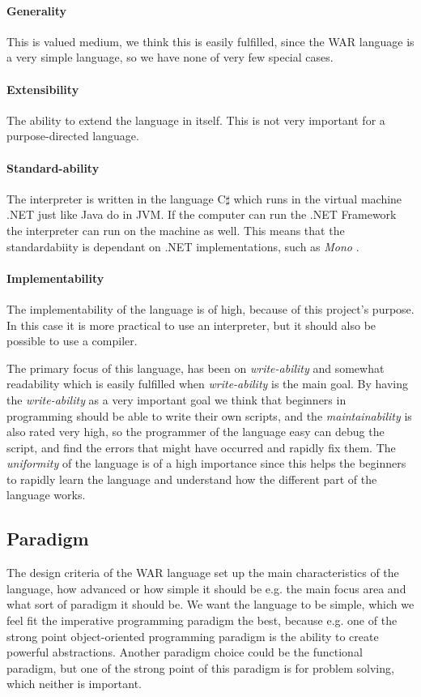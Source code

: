\paragraph{Generality} This is valued medium, we think this is easily fulfilled, since the WAR language is a very simple language, so we have none of very few special cases.

\paragraph{Extensibility} The ability to extend the language in itself. This is not very important for a purpose-directed language.

\paragraph{Standard-ability} The interpreter is written in the language C$\sharp$ which runs in the virtual machine .NET just like Java do in JVM. If the computer can run the .NET Framework the interpreter can run on the machine as well. This means that the standardabiity is dependant on .NET implementations, such as \textit{Mono} \cite{CIL}.

\paragraph{Implementability} The implementability of the language is of high, because of this project's purpose. 
In this case it is more practical to use an interpreter, but it should also be possible to use a compiler. 

The primary focus of this language, has been on \textit{write-ability} and somewhat readability which is easily fulfilled when \textit{write-ability} is the main goal. By having the \textit{write-ability} as a very important goal we think that beginners in programming should be able to write their own scripts, and the \textit{maintainability} is also rated very high, so the programmer of the language easy can debug the script, and find the errors that might have occurred and rapidly fix them. The \textit{uniformity} of the language is of a high importance since this helps the beginners to rapidly learn the language and understand how the different part of the language works.

\subsection{Paradigm}
The design criteria of the WAR language set up the main characteristics of the language, how advanced or how simple it should be e.g. the main focus area and what sort of paradigm it should be. We want the language to be simple, which we feel fit the imperative programming paradigm the best, 
because e.g. one of the strong point object-oriented programming paradigm is the ability to create powerful abstractions. 
Another paradigm choice could be the functional paradigm, 
but one of the strong point of this paradigm is for problem solving, which neither is important. 


